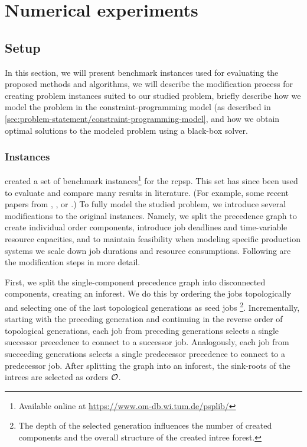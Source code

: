 \chapter{Numerical experiments} \label{chap:numerical-experiments}

\section{Setup} \label{sec:numerical-experiments/setup}

In this section, we will present benchmark instances used for evaluating the proposed methods and algorithms,
we will describe the modification process for creating problem instances suited to our studied problem,
briefly describe how we model the problem in the constraint-programming model
(as described in \cref{sec:problem-statement/constraint-programming-model},
and how we obtain optimal solutions to the modeled problem using a black-box solver.

\subsection*{Instances} \label{subsec:numerical-experiments/setup/instances}

\citet{KOLISCH1997} created a set of benchmark instances\footnote{Available online at \url{https://www.om-db.wi.tum.de/psplib/}}
for the \ac{rcpsp}.
This set has since been used to evaluate and compare many results in literature.
(For example, some recent papers from \citet{Bianco2011}, \citet{Cheng2015}, or \citet{Elsayed2017}.)
To fully model the studied problem, we introduce several modifications to the original instances.
Namely, we split the precedence graph to create individual order components,
introduce job deadlines and time-variable resource capacities,
and to maintain feasibility when modeling specific production systems
we scale down job durations and resource consumptions.
Following are the modification steps in more detail.

First, we split the single-component precedence graph into disconnected components,
creating an inforest.
We do this by ordering the jobs topologically
and selecting one of the last topological generations as seed jobs%
\footnote{The depth of the selected generation influences the number of created components
and the overall structure of the created intree forest.}.
Incrementally, starting with the preceding generation and continuing in the reverse order of topological generations,
each job from preceding generations selects a single successor precedence to connect to a successor job.
Analogously, each job from succeeding generations selects a single predecessor precedence to connect to a predecessor job.
After splitting the graph into an inforest, the sink-roots of the intrees are selected as orders $\mathcal{O}$.

